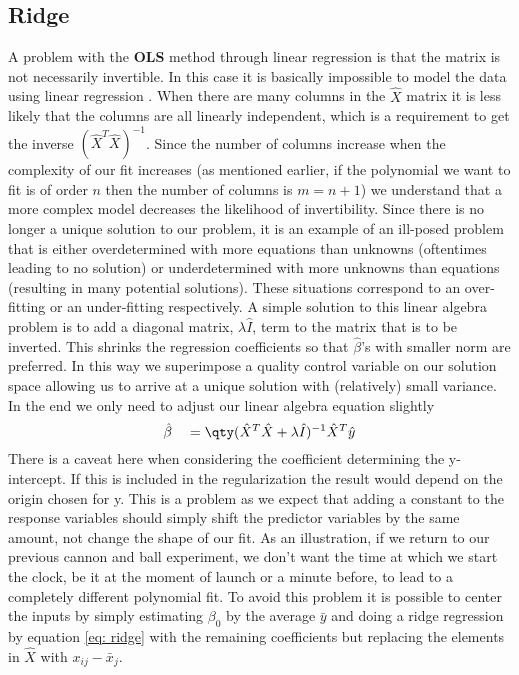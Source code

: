 \subsection{Ridge}
A problem with the \textbf{OLS} method through linear regression is that the matrix is not necessarily invertible. In this case it is basically impossible to model the data using linear regression \cite{morten-reg}. When there are many columns in the $\hat{X}$ matrix it is less likely that the columns are all linearly independent, which is a requirement to get the inverse $(\hat{X}^T\hat{X})^{-1}$. Since the number of columns increase when the complexity of our fit increases (as mentioned earlier, if the polynomial we want to fit is of order $n$ then the number of columns is $m=n+1$) we understand that a more complex model decreases the likelihood of invertibility. Since there is no longer a unique solution to our problem, it is an example of an ill-posed problem that is either overdetermined with more equations than unknowns (oftentimes leading to no solution) or underdetermined with more unknowns than equations (resulting in many potential solutions). These situations correspond to an over-fitting or an under-fitting respectively. \cite{wiki-tikhonob} A simple solution to this linear algebra problem is to add a diagonal matrix, $\lambda \hat{I}$, term to the matrix that is to be inverted. This shrinks the regression coefficients so that $\hat{\beta}$'s with smaller norm are preferred. In this way we superimpose a quality control variable on our solution space allowing us to arrive at a unique solution with (relatively) small variance. \cite{hastie}
In the end we only need to adjust our linear algebra equation slightly
\begin{equation}\label{eq: ridge}
	\hat{\beta} \quad= \qty(\hat{X}^T\hat{X}+\lambda \hat{I})^{-1}\hat{X}^T\hat{y}
\end{equation}
There is a caveat here when considering the coefficient determining the y-intercept. If this is included in the regularization the result would depend on the origin chosen for y.\cite{hastie} This is a problem as we expect that adding a constant to the response variables should simply shift the predictor variables by the same amount, not change the shape of our fit. As an illustration, if we return to our previous cannon and ball experiment, we don't want the time at which we start the clock, be it at the moment of launch or a minute before, to lead to a completely different polynomial fit. To avoid this problem it is possible to center the inputs by simply estimating $\beta_0$ by the average $\bar{y}$ and doing a ridge regression by equation \ref{eq: ridge} with the remaining coefficients but replacing the elements in $\hat{X}$ with $x_{ij}-\bar{x}_j$.

